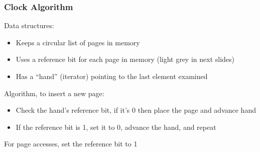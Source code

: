   \begin{frame}
    \frametitle{Clock Algorithm}

    Data structures:
    \begin{itemize}
      \item Keeps a circular list of pages in memory
      \item Uses a reference bit for each page in memory (light grey in next slides)
      \item Has a ``hand'' (iterator) pointing to the last element examined
    \end{itemize}

    \vspace{2em}

    Algorithm, to insert a new page:
    \begin{itemize}
      \item Check the hand's reference bit, if it's 0 then place the page and advance hand
      \item If the reference bit is 1, set it to 0, advance the hand, and repeat
    \end{itemize}

    \vspace{2em}

    For page accesses, set the reference bit to 1
  \end{frame}

